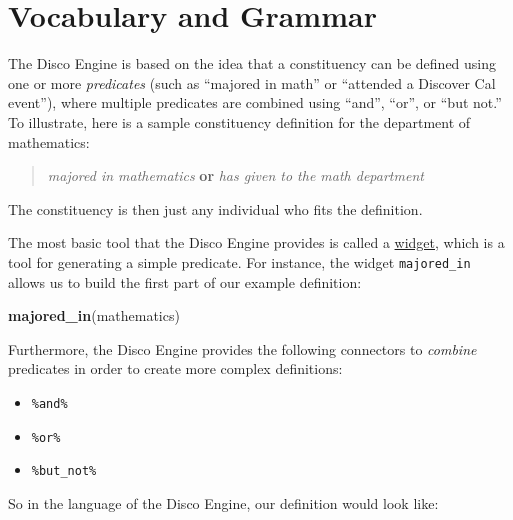 \documentclass[]{book}
\newenvironment{Shaded}{\begin{snugshade}}{\end{snugshade}}
\newcommand{\KeywordTok}[1]{\textcolor[rgb]{0.13,0.29,0.53}{\textbf{#1}}}
\newcommand{\NormalTok}[1]{#1}
\newcommand{\OperatorTok}[1]{\textcolor[rgb]{0.81,0.36,0.00}{\textbf{#1}}}
\newcommand{\StringTok}[1]{\textcolor[rgb]{0.31,0.60,0.02}{#1}}
\providecommand{\tightlist}{%
  \setlength{\itemsep}{0pt}\setlength{\parskip}{0pt}}
\begin{document}
\hypertarget{vocabulary-and-grammar}{%
\section{Vocabulary and Grammar}\label{vocabulary-and-grammar}}

The Disco Engine is based on the idea that a constituency can be defined using one or more \emph{predicates} (such as ``majored in math'' or ``attended a Discover Cal event''), where multiple predicates are combined using ``and'', ``or'', or ``but not.'' To illustrate, here is a sample constituency definition for the department of mathematics:

\begin{quote}
\emph{majored in mathematics} \textbf{or} \emph{has given to the math department}
\end{quote}

The constituency is then just any individual who fits the definition.

The most basic tool that the Disco Engine provides is called a \protect\hyperlink{working-with-widgets}{widget}, which is a tool for generating a simple predicate. For instance, the widget \texttt{majored\_in} allows us to build the first part of our example definition:

\begin{Shaded}
\begin{Highlighting}[]
\KeywordTok{majored_in}\NormalTok{(mathematics)}
\end{Highlighting}
\end{Shaded}

Furthermore, the Disco Engine provides the following connectors to \emph{combine} predicates in order to create more complex definitions:

\begin{itemize}
\tightlist
\item
  \texttt{\%and\%}
\item
  \texttt{\%or\%}
\item
  \texttt{\%but\_not\%}
\end{itemize}

So in the language of the Disco Engine, our definition would look like:

\begin{Shaded}
\end{Shaded}
\end{document}
